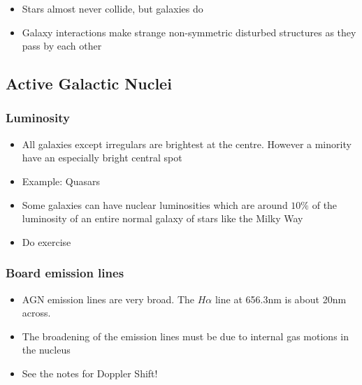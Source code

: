 \documentclass{article}
\begin{document}
\begin{itemize}
\item Stars almost never collide, but galaxies do
\item Galaxy interactions make strange non-symmetric disturbed structures as they pass by each other
\end{itemize}
\subsection{Active Galactic Nuclei}
\subsubsection{Luminosity}
\begin{itemize}
\item All galaxies except irregulars are brightest at the centre. However a minority have an especially bright central spot
\item Example: Quasars
\item Some galaxies can have nuclear luminosities which are around $10\%$ of the luminosity of an entire normal galaxy of stars like the Milky Way
\item Do exercise 
\end{itemize}
\subsubsection{Board emission lines}
\begin{itemize}
\item AGN emission lines are very broad. The $H\alpha$ line at 656.3nm is about 20nm across.
\item The broadening of the emission lines must be due to internal gas motions
in the nucleus
\item See the notes for Doppler Shift!
\end{itemize}
\end{document}
